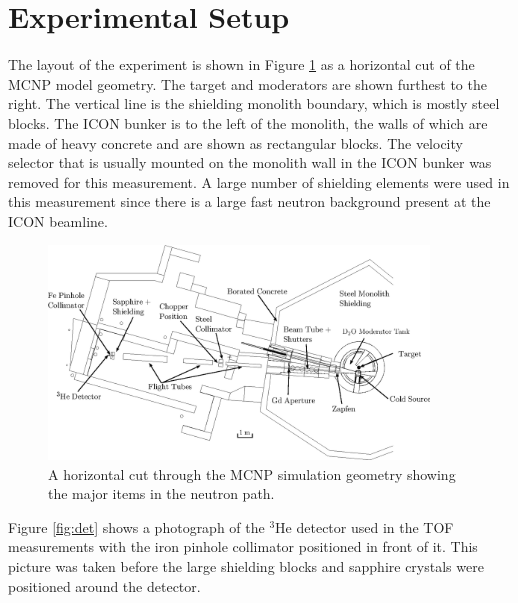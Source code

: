 \documentclass[5p,12pt]{elsarticle}
\begin{document}
%
%
%
%
%


\section{Experimental Setup}
\label{sec:setup}

The layout of the experiment is shown in Figure \ref{fig:geom} as a horizontal cut of the MCNP model geometry.  The target and moderators are shown furthest to the right.  The vertical line is the shielding monolith boundary, which is mostly steel blocks.  The ICON bunker is to the left of the monolith, the walls of which are made of heavy concrete and are shown as rectangular blocks.  The velocity selector that is usually mounted on the monolith wall in the ICON bunker was removed for this measurement.  A large number of shielding elements were used in this measurement since there is a large fast neutron background present at the ICON beamline.

\begin{figure}[ht!] 
  \centering
    \includegraphics[width=0.9\textwidth]{graphics/geom_bw_labels.eps}
     \caption{A horizontal cut through the MCNP simulation geometry showing the major items in the neutron path. \label{fig:geom} }
\end{figure}

Figure \ref{fig:det} shows a photograph of the $^3$He detector used in the TOF measurements with the iron pinhole collimator positioned in front of it.   This picture was taken before the large shielding blocks and sapphire crystals were positioned around the detector.
\end{document}
